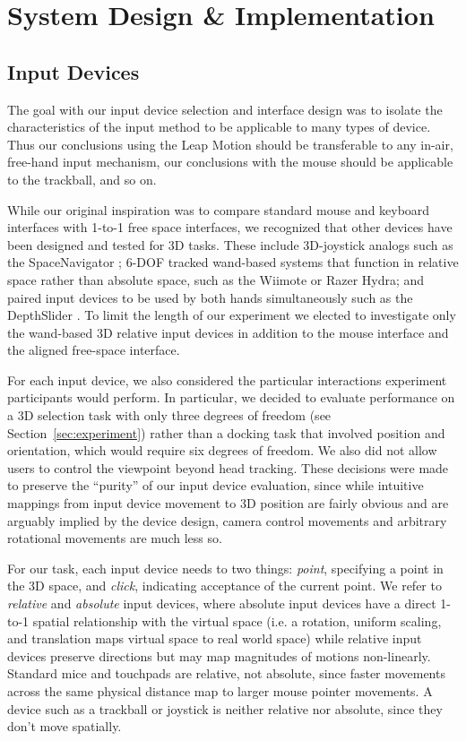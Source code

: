 \section{System Design \& Implementation}\label{sec:design}

\subsection{Input Devices}
The goal with our input device selection and interface design was to isolate the
characteristics of the input method to be applicable to many types of device.
Thus our conclusions using the Leap Motion should be transferable to any in-air,
free-hand input mechanism, our conclusions with the mouse should be
applicable to the trackball, and so on.

While our original inspiration was to compare standard mouse and keyboard
interfaces with 1-to-1 free space interfaces, we recognized that other devices
have been designed and tested for 3D tasks. These include 3D-joystick analogs
such as the SpaceNavigator \cite{mattheiss2011navigating}; 6-DOF tracked
wand-based systems that function in relative space rather than absolute space,
such as the Wiimote or Razer Hydra; and paired input devices to be used by both
hands simultaneously such as the DepthSlider \cite{study1}. To limit the length
of our experiment we elected to investigate only the wand-based 3D relative
input devices in addition to the mouse interface and the aligned free-space
interface.

For each input device, we also considered the particular interactions experiment
participants would perform. In particular, we decided to evaluate performance on
a 3D selection task with only three degrees of freedom (see
Section~\ref{sec:experiment}) rather than a docking task that involved position
and orientation, which would require six degrees of freedom. We also did not
allow users to control the viewpoint beyond head tracking. These decisions were
made to preserve the ``purity'' of our input device evaluation, since while
intuitive mappings from input device movement to 3D position are fairly obvious
and are arguably implied by the device design, camera control movements and
arbitrary rotational movements are much less so.

For our task, each input device needs to two things: {\it point}, specifying a
point in the 3D space, and {\it click}, indicating acceptance of the current
point. We refer to {\it relative} and {\it absolute} input devices, where
absolute input devices have a direct 1-to-1 spatial relationship with the
virtual space (i.e. a rotation, uniform scaling, and translation  maps virtual
space to real world space) while relative input devices preserve directions but
may map magnitudes of motions non-linearly. Standard mice and touchpads are
relative, not absolute, since faster movements across the same physical
distance map to larger mouse pointer movements. A device such as a trackball or
joystick is neither relative nor absolute, since they don't move spatially.

